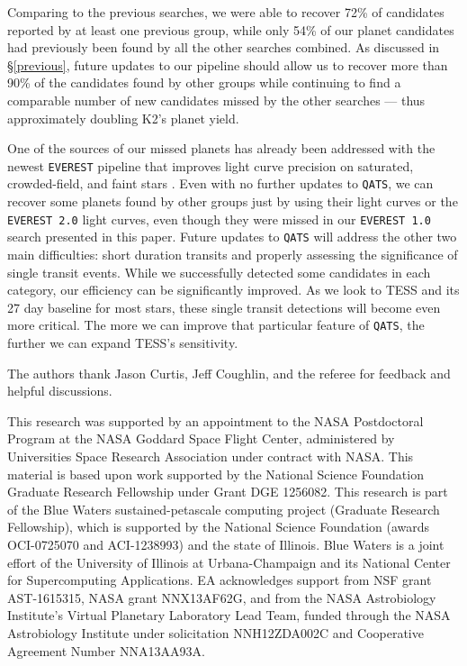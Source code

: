 \documentclass[twocolumn]{aastex62}
\newcommand{\pipeline}[1]{\texttt{#1}}
\newcommand{\myoverlap}{72}
\newcommand{\theiroverlap}{54}
\begin{document}
Comparing to the previous searches, we were able to recover
\myoverlap{}\% of candidates reported by at least one previous group,
while only \theiroverlap{}\% of our planet candidates had previously
been found by all the other searches combined. As discussed in
\S\ref{previous}, future updates to our pipeline should allow us to
recover more than 90\% of the candidates found by other groups while
continuing to find a comparable number of new candidates missed by the
other searches --- thus approximately doubling K2's planet yield.

One of the sources of our missed planets has already been addressed
with the newest \pipeline{EVEREST} pipeline that improves light curve
precision on saturated, crowded-field, and faint stars
\citep{lug18}. Even with no further updates to \pipeline{QATS}, we can
recover some planets found by other groups just by using their light
curves or the \pipeline{EVEREST 2.0} light curves, even though they
were missed in our \pipeline{EVEREST 1.0} search presented in this
paper.  Future updates to \pipeline{QATS} will address the other two
main difficulties: short duration transits and properly assessing the
significance of single transit events. While we successfully detected
some candidates in each category, our efficiency can be significantly
improved. As we look to TESS and its 27 day baseline for most stars,
these single transit detections will become even more critical. The
more we can improve that particular feature of \pipeline{QATS}, the
further we can expand TESS's sensitivity.


\acknowledgements

The authors thank Jason Curtis, Jeff Coughlin, and the referee for
feedback and helpful discussions.

This research was supported by an appointment to the NASA Postdoctoral
Program at the NASA Goddard Space Flight Center, administered by
Universities Space Research Association under contract with NASA.
This material is based upon work supported by the National Science
Foundation Graduate Research Fellowship under Grant DGE 1256082. This
research is part of the Blue Waters sustained-petascale computing
project (Graduate Research Fellowship), which is supported by the
National Science Foundation (awards OCI-0725070 and ACI-1238993) and
the state of Illinois. Blue Waters is a joint effort of the University
of Illinois at Urbana-Champaign and its National Center for
Supercomputing Applications.  EA acknowledges support from NSF grant
AST-1615315, NASA grant NNX13AF62G, and from the NASA Astrobiology
Institute's Virtual Planetary Laboratory Lead Team, funded through the
NASA Astrobiology Institute under solicitation NNH12ZDA002C and
Cooperative Agreement Number NNA13AA93A.
\end{document}
